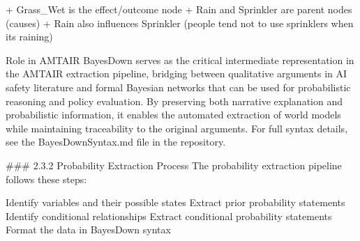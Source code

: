 \documentclass[
  11pt,
  letterpaper,
]{book}
\newenvironment{Shaded}{\begin{snugshade}}{\end{snugshade}}
\newcommand{\ErrorTok}[1]{\textcolor[rgb]{0.68,0.00,0.00}{#1}}
\begin{document}
\begin{Shaded}
\begin{Highlighting}[]
\ErrorTok{+} \ErrorTok{Grass\_Wet} \ErrorTok{is} \ErrorTok{the} \ErrorTok{effect/outcome} \ErrorTok{node}
\ErrorTok{+} \ErrorTok{Rain} \ErrorTok{and} \ErrorTok{Sprinkler} \ErrorTok{are} \ErrorTok{parent} \ErrorTok{nodes} \ErrorTok{(causes)}
\ErrorTok{+} \ErrorTok{Rain} \ErrorTok{also} \ErrorTok{influences} \ErrorTok{Sprinkler} \ErrorTok{(people} \ErrorTok{tend} \ErrorTok{not} \ErrorTok{to} \ErrorTok{use} \ErrorTok{sprinklers} \ErrorTok{when} \ErrorTok{it\textquotesingle{}s} \ErrorTok{raining)}

\ErrorTok{Role} \ErrorTok{in} \ErrorTok{AMTAIR}
\ErrorTok{BayesDown} \ErrorTok{serves} \ErrorTok{as} \ErrorTok{the} \ErrorTok{critical} \ErrorTok{intermediate} \ErrorTok{representation} \ErrorTok{in} \ErrorTok{the} \ErrorTok{AMTAIR} \ErrorTok{extraction} \ErrorTok{pipeline,} \ErrorTok{bridging} \ErrorTok{between} \ErrorTok{qualitative} \ErrorTok{arguments} \ErrorTok{in} \ErrorTok{AI} \ErrorTok{safety} \ErrorTok{literature} \ErrorTok{and} \ErrorTok{formal} \ErrorTok{Bayesian} \ErrorTok{networks} \ErrorTok{that} \ErrorTok{can} \ErrorTok{be} \ErrorTok{used} \ErrorTok{for} \ErrorTok{probabilistic} \ErrorTok{reasoning} \ErrorTok{and} \ErrorTok{policy} \ErrorTok{evaluation.} \ErrorTok{By} \ErrorTok{preserving} \ErrorTok{both} \ErrorTok{narrative} \ErrorTok{explanation} \ErrorTok{and} \ErrorTok{probabilistic} \ErrorTok{information,} \ErrorTok{it} \ErrorTok{enables} \ErrorTok{the} \ErrorTok{automated} \ErrorTok{extraction} \ErrorTok{of} \ErrorTok{world} \ErrorTok{models} \ErrorTok{while} \ErrorTok{maintaining} \ErrorTok{traceability} \ErrorTok{to} \ErrorTok{the} \ErrorTok{original} \ErrorTok{arguments.}
\ErrorTok{For} \ErrorTok{full} \ErrorTok{syntax} \ErrorTok{details,} \ErrorTok{see} \ErrorTok{the} \ErrorTok{BayesDownSyntax.md} \ErrorTok{file} \ErrorTok{in} \ErrorTok{the} \ErrorTok{repository.}

\ErrorTok{\#\#\#} \ErrorTok{2.3.2} \ErrorTok{Probability} \ErrorTok{Extraction} \ErrorTok{Process}
\ErrorTok{The} \ErrorTok{probability} \ErrorTok{extraction} \ErrorTok{pipeline} \ErrorTok{follows} \ErrorTok{these} \ErrorTok{steps:}


\ErrorTok{Identify} \ErrorTok{variables} \ErrorTok{and} \ErrorTok{their} \ErrorTok{possible} \ErrorTok{states}
\ErrorTok{Extract} \ErrorTok{prior} \ErrorTok{probability} \ErrorTok{statements}
\ErrorTok{Identify} \ErrorTok{conditional} \ErrorTok{relationships}
\ErrorTok{Extract} \ErrorTok{conditional} \ErrorTok{probability} \ErrorTok{statements}
\ErrorTok{Format} \ErrorTok{the} \ErrorTok{data} \ErrorTok{in} \ErrorTok{BayesDown} \ErrorTok{syntax}


\end{Highlighting}
\end{Shaded}
\end{document}
